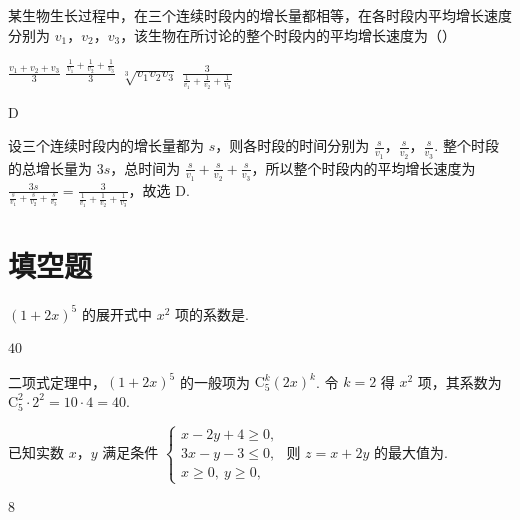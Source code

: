 \begin{problem}
某生物生长过程中，在三个连续时段内的增长量都相等，在各时段内平均增长速度分别为 \(v_1\)，\(v_2\)，\(v_3\)，该生物在所讨论的整个时段内的平均增长速度为（\quad）

\choices
    {\(\frac{v_1 + v_2 + v_3}{3}\)}
    {\(\frac{\frac{1}{v_1} + \frac{1}{v_2} + \frac{1}{v_3}}{3}\)}
    {\(\sqrt[3]{v_1 v_2 v_3}\)}
    {\(\frac{3}{\frac{1}{v_1} + \frac{1}{v_2} + \frac{1}{v_3}}\)}
\end{problem}

\begin{answer}
D
\end{answer}

\begin{solution}
设三个连续时段内的增长量都为 \(s\)，则各时段的时间分别为 \(\frac{s}{v_1}\)，\(\frac{s}{v_2}\)，\(\frac{s}{v_3}\). 整个时段的总增长量为 \(3s\)，总时间为 \(\frac{s}{v_1}+\frac{s}{v_2}+\frac{s}{v_3}\)，所以整个时段内的平均增长速度为
\(\frac{3s}{\frac{s}{v_1}+\frac{s}{v_2}+\frac{s}{v_3}}=\frac{3}{\frac1{v_1}+\frac1{v_2}+\frac1{v_3}}\)，故选 D.
\end{solution}

\section{填空题}

\begin{problem}
\((1 + 2x)^5\) 的展开式中 \(x^2\) 项的系数是\fillinblank{}.
\end{problem}

\begin{answer}
\(40\)
\end{answer}

\begin{solution}
二项式定理中，\((1+2x)^5\) 的一般项为 \(\mathrm C_5^k(2x)^k\). 令 \(k=2\) 得 \(x^2\) 项，其系数为 \(\mathrm C_5^2\cdot2^2=10\cdot4=40\).
\end{solution}

\begin{problem}
已知实数 \(x\)，\(y\) 满足条件 \(\begin{cases}
x - 2y + 4 \geqslant 0,\\
3x - y - 3 \leqslant 0,\\
x \geqslant 0,\ y \geqslant 0,
\end{cases}\) 则 \(z = x + 2y\) 的最大值为\fillinblank{}.
\end{problem}

\begin{answer}
\(8\)
\end{answer}

